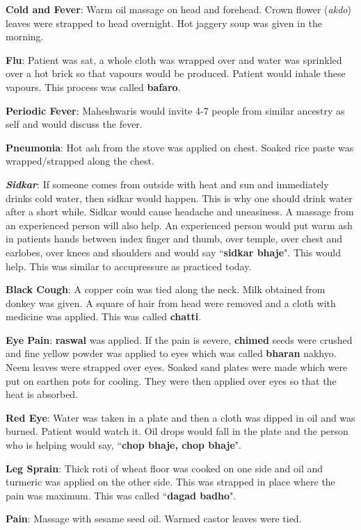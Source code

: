 \textbf{Cold and Fever}: Warm oil massage on head and forehead. Crown flower
(\textit{akdo}) leaves were strapped to head overnight. Hot jaggery soup was
given in the morning.

\textbf{Flu}: Patient was sat, a whole cloth was wrapped over and water was
sprinkled over a hot brick so that vapours would be produced. Patient would
inhale these vapours. This process was called \textbf{bafaro}.

\textbf{Periodic Fever}: Maheshwaris would invite 4-7 people from similar
ancestry as self and would discuss the fever.

\textbf{Pneumonia}: Hot ash from the stove was applied on chest. Soaked rice
paste was wrapped/strapped along the chest.

\textbf{\textit{Sidkar}}: If someone comes from outside with heat and sun and
immediately drinks cold water, then sidkar would happen. This is why one should
drink water after a short while. Sidkar would cause headache and uneasiness. A
massage from an experienced person will also help. An experienced person would
put warm ash in patients hands between index finger and thumb, over temple,
over chest and earlobes, over knees and shoulders and would say
``\textbf{sidkar bhaje}". This would help. This was similar to accupressure as
practiced today.

\textbf{Black Cough}: A copper coin was tied along the neck. Milk obtained from
donkey was given. A square of hair from head were removed and a cloth with
medicine was applied. This was called \textbf{chatti}.

\textbf{Eye Pain}: \textbf{raswal} was applied. If the pain is severe,
\textbf{chimed} seeds were crushed and fine yellow powder was applied to eyes
which was called \textbf{bharan} nakhyo. Neem leaves were strapped over eyes.
Soaked sand plates were made which were put on earthen pots for cooling. They
were then applied over eyes so that the heat is absorbed. 

\textbf{Red Eye}: Water was taken in a plate and then a cloth was dipped in oil
and was burned. Patient would watch it. Oil drops would fall in the plate and
the person who is helping would say, ``\textbf{chop bhaje, chop bhaje}". 

\textbf{Leg Sprain}: Thick roti of wheat floor was cooked on one side and oil
and turmeric was applied on the other side. This was strapped in place where
the pain was maximum. This was called ``\textbf{dagad badho}".

\textbf{Pain}: Massage with sesame seed oil. Warmed castor leaves were tied.


